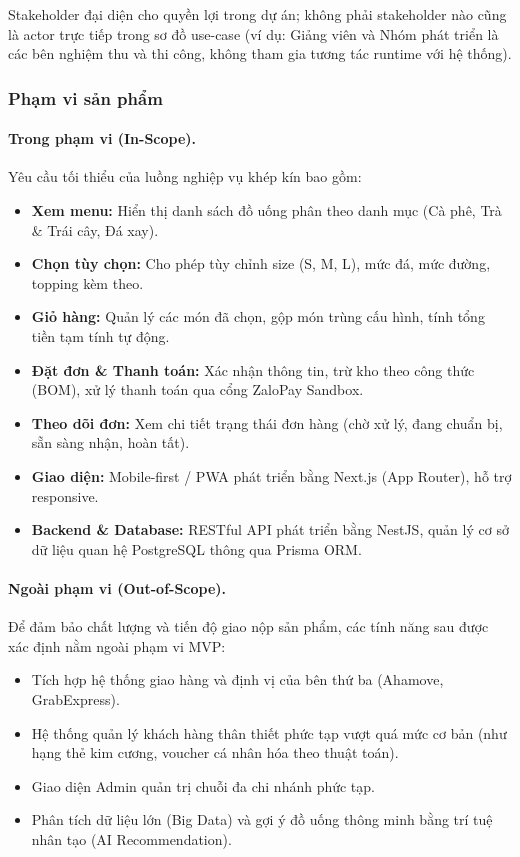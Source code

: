 \begin{note}
Stakeholder đại diện cho quyền lợi trong dự án; không phải stakeholder nào cũng là actor trực tiếp trong sơ đồ use-case (ví dụ: Giảng viên và Nhóm phát triển là các bên nghiệm thu và thi công, không tham gia tương tác runtime với hệ thống).
\end{note}

\subsubsection{Phạm vi sản phẩm}

\paragraph{Trong phạm vi (In-Scope).}
Yêu cầu tối thiểu của luồng nghiệp vụ khép kín bao gồm:
\begin{itemize}[leftmargin=1.5em]
  \item \textbf{Xem menu:} Hiển thị danh sách đồ uống phân theo danh mục (Cà phê, Trà \& Trái cây, Đá xay).
  \item \textbf{Chọn tùy chọn:} Cho phép tùy chỉnh size (S, M, L), mức đá, mức đường, topping kèm theo.
  \item \textbf{Giỏ hàng:} Quản lý các món đã chọn, gộp món trùng cấu hình, tính tổng tiền tạm tính tự động.
  \item \textbf{Đặt đơn \& Thanh toán:} Xác nhận thông tin, trừ kho theo công thức (BOM), xử lý thanh toán qua cổng ZaloPay Sandbox.
  \item \textbf{Theo dõi đơn:} Xem chi tiết trạng thái đơn hàng (chờ xử lý, đang chuẩn bị, sẵn sàng nhận, hoàn tất).
  \item \textbf{Giao diện:} Mobile-first / PWA phát triển bằng Next.js (App Router), hỗ trợ responsive.
  \item \textbf{Backend \& Database:} RESTful API phát triển bằng NestJS, quản lý cơ sở dữ liệu quan hệ PostgreSQL thông qua Prisma ORM.
\end{itemize}

\paragraph{Ngoài phạm vi (Out-of-Scope).}
Để đảm bảo chất lượng và tiến độ giao nộp sản phẩm, các tính năng sau được xác định nằm ngoài phạm vi MVP:
\begin{itemize}[leftmargin=1.5em]
  \item Tích hợp hệ thống giao hàng và định vị của bên thứ ba (Ahamove, GrabExpress).
  \item Hệ thống quản lý khách hàng thân thiết phức tạp vượt quá mức cơ bản (như hạng thẻ kim cương, voucher cá nhân hóa theo thuật toán).
  \item Giao diện Admin quản trị chuỗi đa chi nhánh phức tạp.
  \item Phân tích dữ liệu lớn (Big Data) và gợi ý đồ uống thông minh bằng trí tuệ nhân tạo (AI Recommendation).
\end{itemize}

